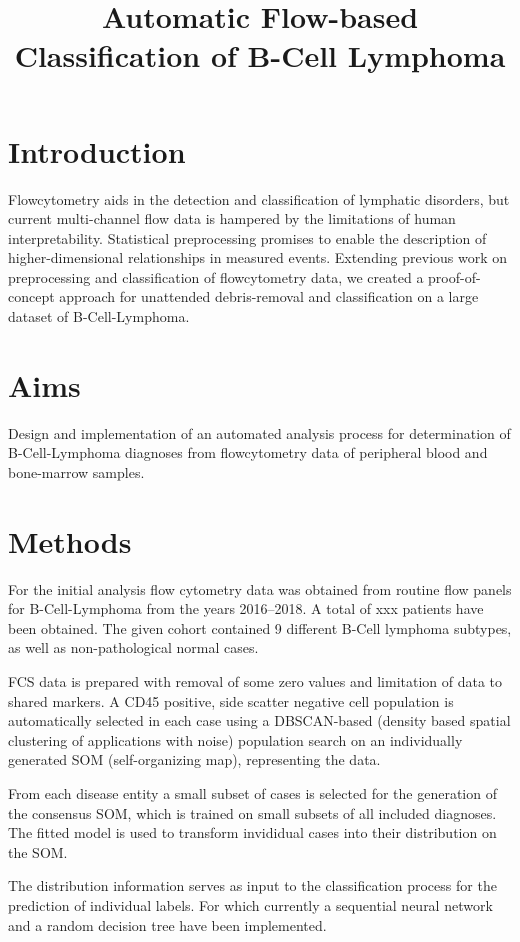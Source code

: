 \documentclass[11pt,a4paper]{article}
\begin{document}
\title{Automatic Flow-based Classification of B-Cell Lymphoma}


\section{Introduction}

Flowcytometry aids in the detection and classification of lymphatic disorders, but current multi-channel flow data is hampered by the limitations of human interpretability.
Statistical preprocessing promises to enable the description of higher-dimensional relationships in measured events.
Extending previous work on preprocessing and classification of flowcytometry data, we created a proof-of-concept approach for unattended debris-removal and classification on a large dataset of B-Cell-Lymphoma.

\section{Aims}

Design and implementation of an automated analysis process for determination of B-Cell-Lymphoma diagnoses from flowcytometry data of peripheral blood and bone-marrow samples.


\section{Methods}

For the initial analysis flow cytometry data was obtained from routine flow panels for B-Cell-Lymphoma from the years 2016--2018. A total of xxx patients have been obtained. The given cohort contained 9 different B-Cell lymphoma subtypes, as well as non-pathological normal cases.

FCS data is prepared with removal of some zero values and limitation of data to shared markers. A CD45 positive, side scatter negative cell population is automatically selected in each case using a DBSCAN-based (density based spatial clustering of applications with noise) population search on an individually generated SOM (self-organizing map), representing the data.

From each disease entity a small subset of cases is selected for the generation of the consensus SOM, which is trained on small subsets of all included diagnoses. The fitted model is used to transform invididual cases into their distribution on the SOM.

The distribution information serves as input to the classification process for the prediction of individual labels. For which currently a sequential neural network and a random decision tree have been implemented.
\end{document}
